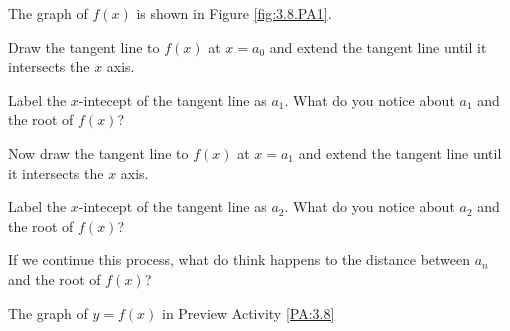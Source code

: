 \begin{pa} \label{PA:3.8}
The graph of $f(x)$ is shown in Figure \ref{fig:3.8.PA1}. 
\ba
	\item Draw the tangent line to $f(x)$ at $x=a_0$ and extend the tangent line until it intersects the $x$ axis. 
	\item Label the $x$-intecept of the tangent line as $a_1$. What do you notice about $a_1$ and the root of $f(x)$?
	\item Now draw the tangent line to $f(x)$ at $x=a_1$ and extend the tangent line until it intersects the $x$ axis.
	\item  Label the $x$-intecept of the tangent line as $a_2$. What do you notice about $a_2$ and the root of $f(x)$?
	\item If we continue this process, what do think happens to the distance between $a_n$ and the root of $f(x)$?
\ea
\end{pa} 
\afterpa

\begin{marginfigure}[-6cm]
\caption{The graph of $y=f(x)$ in Preview Activity \ref{PA:3.8}}\label{fig:3.8.PA1}
\end{marginfigure}